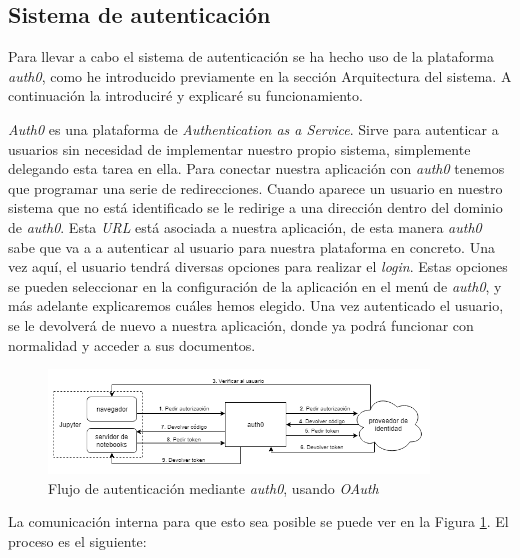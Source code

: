 \documentclass[11pt,spanish,listoffigures]{tfgetsinf}
\begin{document}
\subsection{Sistema de autenticación}
\label{subsec:diseno-auth}

Para llevar a cabo el sistema de autenticación se ha hecho uso de la plataforma \textit{auth0}, como he introducido previamente en la sección Arquitectura del sistema. A continuación la introduciré y explicaré su funcionamiento.

\textit{Auth0} es una plataforma de \textit{Authentication as a Service}. Sirve para autenticar a usuarios sin necesidad de implementar nuestro propio sistema, simplemente delegando esta tarea en ella. Para conectar nuestra aplicación con \textit{auth0} tenemos que programar una serie de redirecciones. Cuando aparece un usuario en nuestro sistema que no está identificado se le redirige a una dirección dentro del dominio de \textit{auth0}. Esta \textit{URL} está asociada a nuestra aplicación, de esta manera \textit{auth0} sabe que va a a autenticar al usuario para nuestra plataforma en concreto. Una vez aquí, el usuario tendrá diversas opciones para realizar el \textit{login}. Estas opciones se pueden seleccionar en la configuración de la aplicación en el menú de \textit{auth0}, y más adelante explicaremos cuáles hemos elegido. Una vez autenticado el usuario, se le devolverá de nuevo a nuestra aplicación, donde ya podrá funcionar con normalidad y acceder a sus documentos.

\begin{figure}[h]
	\centering
  	\includegraphics[width=0.9\textwidth]{auth0-flow.png}
  	\caption{Flujo de autenticación mediante \textit{auth0}, usando \textit{OAuth}}
  	\label{fig:auth0-scheme}
\end{figure}

La comunicación interna para que esto sea posible se puede ver en la Figura \ref{fig:auth0-scheme}. El proceso es el siguiente: 
\end{document}
